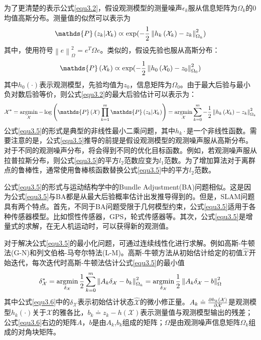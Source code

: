 为了更清楚的表示公式\ref{equ3.2}，假设观测模型的测量噪声$\epsilon_k$服从信息矩阵为$\Omega_k$的0均值高斯分布。测量值的似然可以表示为
\begin{equation}
\label{equ3.3}
\mathds{P}\left(z_k \vert \mathcal{X}_k  \right) \varpropto \exp ( -{1 \over 2} \left\| h_k\left( \mathcal{X}_k \right) - z_k \right\|_{\Omega_k}^2 )
\end{equation}
其中，使用符号$\left\| e \right\|_{\Omega}^2 = e^T \Omega e$。类似的，假设先验也服从高斯分布：
\begin{equation}
\label{equ3.4}
\mathds{P}\left( \mathcal{X}_k  \right) \varpropto \exp ( -{1 \over 2} \left\| h_0\left( \mathcal{X}_0 \right) - z_0 \right\|_{\Omega_0}^2 )
\end{equation}
其中$h_0(\cdot)$表示观测模型，先验均值为$z_0$，信息矩阵为$\Omega_0$。由于最大后验与最小负对数后验等价，则公式\ref{equ3.2}的最大后验估计可以表示为：
\begin{equation}
\label{equ3.5}
\mathcal{X}^* 
=
\argmin \limits_{\mathcal{X}} - \log \left( \mathds{P}\left(\mathcal{X}\right) \prod \limits_{k=1}^{m} \mathds{P}\left(z_k \vert \mathcal{X}_k  \right) \right)
=
\argmin \limits_{\mathcal{X}} \sum \limits_{k=0}^{m} -{1 \over 2} \left\| h_k\left( \mathcal{X}_k \right) - z_k \right\|_{\Omega_k}^2
\end{equation}
公式\ref{equ3.5}的形式是典型的非线性最小二乘问题，其中$h_k{\cdot}$是一个非线性函数。需要注意的是，公式\ref{equ3.5}推导的前提是假设观测模型的观测噪声服从高斯分布。对于不同的观测噪声分布，将会得到不同的优化目标函数。例如，若观测噪声服从拉普拉斯分布，则公式\ref{equ3.5}的平方$l_2$范数应变为$l_1$范数。为了增加算法对于离群点的鲁棒性，通常使用鲁棒核函数替换公式\ref{equ3.5}中的平方$l_2$范数。

公式\ref{equ3.5}的形式与运动结构学中的Bundle Adjustment(BA)问题相似。这是因为公式\ref{equ3.5}与BA都是从最大后验概率估计出发推导得到的。但是，SLAM问题具有两个特点。首先，不同于BA问题受限于几何模型约束，公式\ref{equ3.5}适用于各种传感器模型。比如惯性传感器，GPS，轮式传感器等。其次，公式\ref{equ3.5}是增量式的求解，在无人机运动时，可以获得新的观测值。

对于解决公式\ref{equ3.5}的最小化问题，可通过连续线性化进行求解。例如高斯-牛顿法(G-N)和列文伯格-马夸尔特法(L-M)。高斯-牛顿方法从初始估计给定的初值$\hat{\mathcal{X}}$开始迭代，每次迭代时高斯-牛顿法估计公式\ref{equ3.5}的最小值
\begin{equation}
\label{equ3.6}
\delta_\mathcal{X}^* 
=
\operatorname*{argmin} \limits_{\delta_\mathcal{X}} {1 \over 2} \sum \limits_{k=0}^{m} \left\| A_k\delta_\mathcal{X}-b_k \right\|_{\Omega_k}^2
=
\operatorname*{argmin} \limits_{\delta_\mathcal{X}} {1 \over 2} \left\| A_k\delta_\mathcal{X}-b \right\|_{\Omega}^2
\end{equation}
其中公式\ref{equ3.6}中的$\delta_\mathcal{X}$表示初始估计状态$\hat{\mathcal{X}}$的微小修正量。$A_k \doteq {\partial h_k(\mathcal{X}) \over \partial \mathcal{X}} $是观测模型$h_k(\cdot)$关于$\mathcal{X}$的雅各比，$b_k \doteq z_k-h(\mathcal{X})$表示测量值与观测模型输出的残差；公式\ref{equ3.6}右边的矩阵$A$，$b$是由$A_k$,$b_k$组成的矩阵；$\Omega$是由观测噪声信息矩阵$\Omega_k$组成的对角块矩阵。

